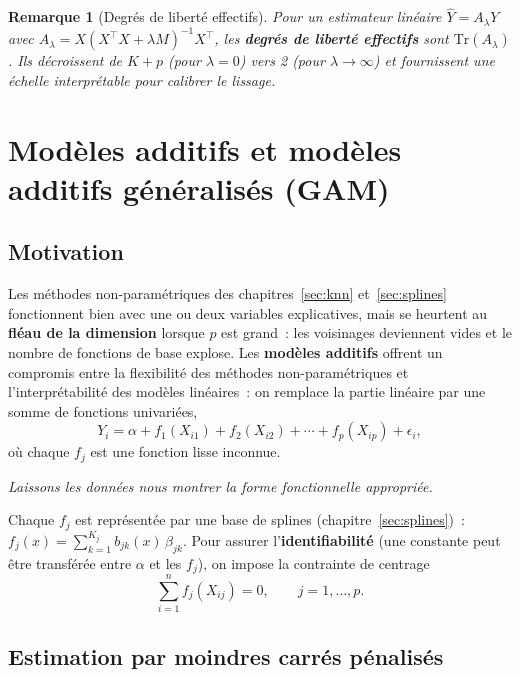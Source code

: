 \documentclass[11pt,letterpaper]{article}
\newtheorem{remarque}{Remarque}[section]
\begin{document}
\begin{remarque}[Degrés de liberté effectifs]
Pour un estimateur linéaire $\hat Y = A_\lambda Y$ avec $A_\lambda = X(X^\top X + \lambda M)^{-1}X^\top$, les \textbf{degrés de liberté effectifs} sont $\mathrm{Tr}(A_\lambda)$. Ils décroissent de $K+p$ (pour $\lambda = 0$) vers 2 (pour $\lambda\to\infty$) et fournissent une échelle interprétable pour calibrer le lissage.
\end{remarque}

\newpage
\section{Modèles additifs et modèles additifs généralisés (GAM)}
\label{sec:gam}

\subsection{Motivation}

Les méthodes non-paramétriques des chapitres~\ref{sec:knn} et~\ref{sec:splines} fonctionnent bien avec une ou deux variables explicatives, mais se heurtent au \textbf{fléau de la dimension} lorsque $p$ est grand~: les voisinages deviennent vides et le nombre de fonctions de base explose. Les \textbf{modèles additifs} offrent un compromis entre la flexibilité des méthodes non-paramétriques et l'interprétabilité des modèles linéaires~: on remplace la partie linéaire par une somme de fonctions univariées,
$$Y_i = \alpha + f_1(X_{i1}) + f_2(X_{i2}) + \cdots + f_p(X_{ip}) + \epsilon_i,$$
où chaque $f_j$ est une fonction lisse inconnue.

\begin{center}
\textit{Laissons les données nous montrer la forme fonctionnelle appropriée.}
\end{center}

Chaque $f_j$ est représentée par une base de splines (chapitre~\ref{sec:splines})~: $f_j(x) = \sum_{k=1}^{K_j} b_{jk}(x)\,\beta_{jk}$. Pour assurer l'\textbf{identifiabilité} (une constante peut être transférée entre $\alpha$ et les $f_j$), on impose la contrainte de centrage
$$\sum_{i=1}^n f_j(X_{ij}) = 0, \qquad j = 1,\ldots,p.$$

\subsection{Estimation par moindres carrés pénalisés}
\end{document}
